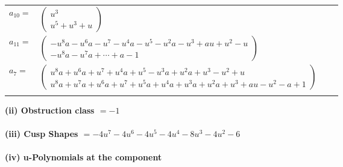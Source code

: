 \documentclass[1p]{elsarticle_modified}
\theoremstyle{definition}
\begin{document}
\begin{tabular}{m{7pt} m{180pt} m{7pt} m{180pt} }
\flushright $a_{10}=$&$\begin{pmatrix}u^3\\u^5+u^3+u\end{pmatrix}$ \\
\flushright $a_{11}=$&$\begin{pmatrix}- u^8 a- u^6 a- u^7- u^4 a- u^5- u^2 a- u^3+a u+u^2- u\\- u^8 a- u^7 a+\cdots+a-1\end{pmatrix}$ \\
\flushright $a_{7}=$&$\begin{pmatrix}u^8 a+u^6 a+u^7+u^4 a+u^5- u^3 a+u^2 a+u^3- u^2+u\\u^8 a+u^7 a+u^6 a+u^7+u^5 a+u^4 a+u^3 a+u^2 a+u^3+a u- u^2- a+1\end{pmatrix}$\\&\end{tabular}
\flushleft \textbf{(ii) Obstruction class $= -1$}\\~\\
\flushleft \textbf{(iii) Cusp Shapes $= -4 u^7-4 u^6-4 u^5-4 u^4-8 u^3-4 u^2-6$}\\~\\
\newpage\renewcommand{\arraystretch}{1}
\flushleft \textbf{(iv) u-Polynomials at the component}\newline \\
\end{document}
